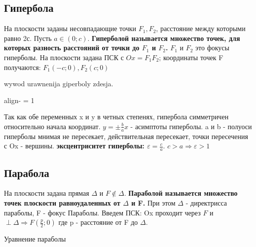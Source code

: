 \documentclass[oneside]{book}
\newcommand{\boxedeq}[2]{\begin{empheq}[box={\fboxsep=6pt\fbox}]{align}\label{#1}#2\end{empheq}}
\begin{document}
\begin{enumerate}
\subsection{Гипербола}
На плоскости заданы несовпадающие точки $F_1, F_2$, расстояние между которыми равно 2с. Пусть $a \in (0; c)$.
\textbf{Гиперболой называется множество точек, для которых разность расстояний от точки до $F_1$ и $F_2$.} $F_1$ и $F_2$ это
фокусы гиперболы. На плоскости задана ПСК с $Ox = F_1F_2$; координаты точек F получаются: $F_1(-c; 0), F_2(c; 0)$
\begin{center}
    \tikzset{>=stealth}

    wywod urawnenija giperboly zdesja.

    \boxedeq{eq:*}{- = 1}

\end{center}
Так как обе переменных x и y в четных степенях, гипербола симметричен относительно начала координат.
$y = \pm\frac{b}{a}x$ - асимптоты гиперболы. a и b - полуоси гиперболы мнимая не пересекает, действительная пересекает, точки пересечения с Ox - вершины.
\textbf{эксцентриситет гиперболы: $\varepsilon = \frac{c}{a}$}. $c > a \Rightarrow \varepsilon >1$

\subsection{Парабола}
На плоскости задана прямая $\Delta$ и $F \notin \Delta$. \textbf{Параболой называется множество точек плоскости
равноудаленных от $\Delta$ и F.} При этом $\Delta$ - директрисса параболы, F - фокус Параболы. Введем ПСК:
Ox проходит через $F$ и $\perp \Delta \Rightarrow F(\frac{p}{2}; 0)$ где p - расстояние от F до $\Delta$.
\begin{center}
    Уравнение параболы


\end{center}
\end{enumerate}
\end{document}
